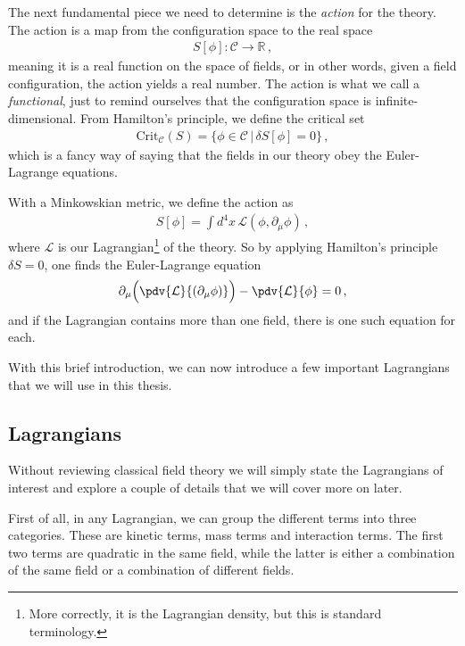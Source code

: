 The next fundamental piece we need to determine is the \emph{action} for the theory. The action is a map from the configuration space to the real space
\begin{align}
    S[\phi]:\mathcal{C}\rightarrow \mathbb{R}\,,
\end{align}
meaning it is a real function on the space of fields, or in other words, given a field configuration, the action yields a real number. The action is what we call a \emph{functional}, just to remind ourselves that the configuration space is infinite-dimensional. From Hamilton's principle, we define the critical set
\begin{align}
    \text{Crit}_{\mathcal{C}}(S)=\{\phi\in\mathcal{C}\,|\,\delta S[\phi]=0\}\,,
\end{align}
which is a fancy way of saying that the fields in our theory obey the Euler-Lagrange equations. 

With a Minkowskian metric, we define the action as
\begin{align}\label{eq:basicaction}
    S[\phi]=\int d^{4}x\,\mathcal{L}(\phi,\partial_{\mu}\phi)\,,
\end{align}
where $\mathcal{L}$ is our Lagrangian\footnote{More correctly, it is the Lagrangian density, but this is standard terminology.} of the theory. So by applying Hamilton's principle $\delta S=0$, one finds the Euler-Lagrange equation
\begin{align}
    \partial_{\mu}\Big(\pdv{\mathcal{L}}{(\partial_{\mu}\phi)}\Big)-\pdv{\mathcal{L}}{\phi}=0\,,
\end{align}
and if the Lagrangian contains more than one field, there is one such equation for each.

With this brief introduction, we can now introduce a few important Lagrangians that we will use in this thesis.

\subsection*{Lagrangians}
Without reviewing classical field theory we will simply state the Lagrangians of interest and explore a couple of details that we will cover more on later. 

First of all, in any Lagrangian, we can group the different terms into three categories. These are kinetic terms, mass terms and interaction terms. The first two terms are quadratic in the same field, while the latter is either a combination of the same field or a combination of different fields. 

